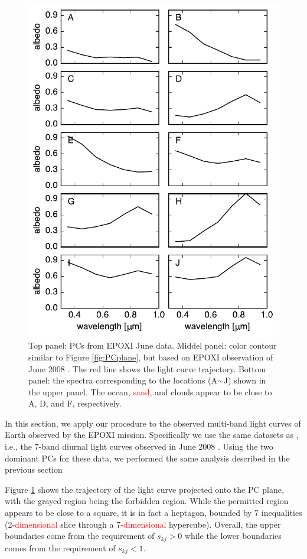 \documentclass[iop,numberedappendix,apj]{emulateapj}
\def\edit#1{\textcolor{red}{#1}}
\begin{document}
\begin{figure}[tbh!]
\begin{center}
	\includegraphics[width=0.85\hsize]{raddata_2_norm_spectra.pdf}
    \end{center}
    \caption{Top panel: PCs from EPOXI June data. Middel panel: color contour similar to Figure \ref{fig:PCplane}, but based on EPOXI observation of June 2008 \citep{Livengood2011}. The red line shows the light curve trajectory. Bottom panel: the spectra corresponding to the locations (A$\sim$J) shown in the upper panel. The ocean, \edit{sand}, and clouds appear to be close to A, D, and F, respectively. }
\label{fig:EPOXI}
\end{figure}



In this section, we apply our procedure to the observed multi-band light curves of Earth observed by the EPOXI mission. 
Specifically we use the same datasets as \citet{Cowan2013}, i.e., the 7-band diurnal light curves observed in June 2008 \citep{Livengood2011}. 
Using the two dominant PCs for these data, we performed the same analysis described in the previous section 

Figure \ref{fig:EPOXI} shows the trajectory of the light curve projected onto the PC plane, with the grayed region being the forbidden region. 
While the permitted region appears to be close to a square, it is in fact a heptagon, bounded by 7 inequalities (2\edit{-dimensional} slice through a 7\edit{-dimensional} hypercube). 
Overall, the upper boundaries come from the requirement of $s_{kj}>0$ while the lower boundaries comes from the requirement of $s_{kj}<1$. 
\end{document}
